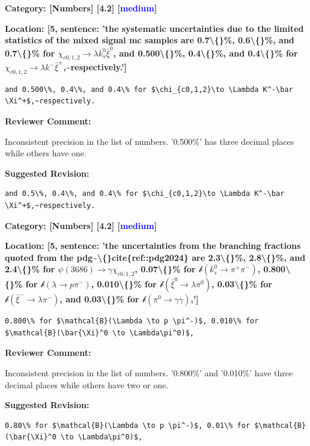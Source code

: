 \documentclass[12pt]{article}
\begin{document}
\begin{reviewer}
\noindent \textbf{Category: [Numbers] [4.2] [\textcolor{blue}{medium}]}

\noindent \textbf{Location: [5, sentence: 'the systematic uncertainties due to the limited statistics of the mixed signal mc samples are 0.7\textbackslash\{\}\%, 0.6\textbackslash\{\}\%, and 0.7\textbackslash\{\}\% for  $\chi_{c0,1,2}\to  \lambda k^0_s\bar \xi^0$, and 0.500\textbackslash\{\}\%, 0.4\textbackslash\{\}\%, and 0.4\textbackslash\{\}\% for $\chi_{c0,1,2}\to \lambda k^-\bar \xi^+$,\textasciitilde{}respectively.']}

\begin{lstlisting}[breaklines=true]
	and 0.500\%, 0.4\%, and 0.4\% for $\chi_{c0,1,2}\to \Lambda K^-\bar \Xi^+$,~respectively.
\end{lstlisting}

\textbf{Reviewer Comment:}

Inconsistent precision in the list of numbers. '0.500\%' has three decimal places while others have one.

\textbf{Suggested Revision:}

\begin{lstlisting}[breaklines=true]
	and 0.5\%, 0.4\%, and 0.4\% for $\chi_{c0,1,2}\to \Lambda K^-\bar \Xi^+$,~respectively.
\end{lstlisting}

\end{reviewer}

\begin{reviewer}
\noindent \textbf{Category: [Numbers] [4.2] [\textcolor{blue}{medium}]}

\noindent \textbf{Location: [5, sentence: 'the uncertainties from the branching fractions quoted from the pdg\textasciitilde{}\textbackslash\{\}cite\{ref::pdg2024\} are 2.3\textbackslash\{\}\%, 2.8\textbackslash\{\}\%, and 2.4\textbackslash\{\}\% for $\psi(3686)\to \gamma\chi_{c0,1,2}$, 0.07\textbackslash\{\}\% for $\mathcal{b}(k^{0}_{s} \to \pi^+ \pi^-)$, 0.800\textbackslash\{\}\% for $\mathcal{b}(\lambda \to p \pi^-)$, 0.010\textbackslash\{\}\% for $\mathcal{b}(\bar{\xi}^0 \to \lambda\pi^0)$, 0.03\textbackslash\{\}\% for $\mathcal{b}(\bar{\xi}^- \to \lambda \pi^-)$, and 0.03\textbackslash\{\}\% for $\mathcal{b}(\pi^0 \to \gamma \gamma)$,']}

\begin{lstlisting}[breaklines=true]
	0.800\% for $\mathcal{B}(\Lambda \to p \pi^-)$, 0.010\% for $\mathcal{B}(\bar{\Xi}^0 \to \Lambda\pi^0)$,
\end{lstlisting}

\textbf{Reviewer Comment:}

Inconsistent precision in the list of numbers. '0.800\%' and '0.010\%' have three decimal places while others have two or one.

\textbf{Suggested Revision:}

\begin{lstlisting}[breaklines=true]
	0.80\% for $\mathcal{B}(\Lambda \to p \pi^-)$, 0.01\% for $\mathcal{B}(\bar{\Xi}^0 \to \Lambda\pi^0)$,
\end{lstlisting}

\end{reviewer}
\end{document}
